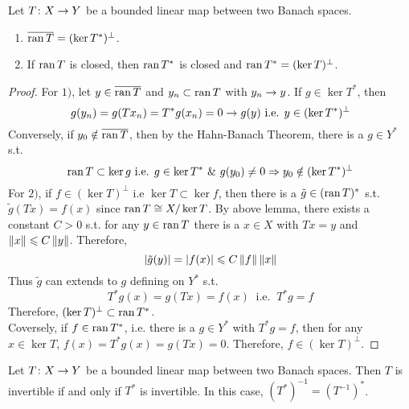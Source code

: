 \documentclass[a4paper,11pt]{report}
\begin{document}
\begin{thm}
	Let $T \colon X \rightarrow Y$ be a bounded linear map between two Banach spaces.
	\begin{enumerate}[label=\arabic*)]
		\item $\overline{\operatorname{ran}{T}} = (\ker{T^{*}})^{\bot}$.
		\item If $\operatorname{ran}{T}$ is closed, then $\operatorname{ran}{T^{*}}$ is closed and $\operatorname{ran}{T^{*}} = (\ker{T})^{\bot}$.
	\end{enumerate}
\end{thm}
\begin{proof}
	For $1)$, let $y \in \overline{\operatorname{ran}{T}}$ and ${y_n} \subset \operatorname{ran}{T}$ with $y_n \rightarrow y$. If $g \in \ker{T^{*}}$, then 
	\begin{equation*}
		g(y_n) = g(Tx_n) = T^{*}g(x_n) = 0 \rightarrow g(y) \text{ i.e. } y \in (\ker{T^{*}})^{\bot}
	\end{equation*}
	Conversely, if $y_0 \notin \overline{\operatorname{ran}{T}}$, then by the Hahn-Banach Theorem, there is a $g \in Y^{*}$ s.t. 
	\begin{equation*}
		\operatorname{ran}{T} \subset \ker{g} \text{ i.e. } g \in \ker{T^{*}} ~\&~ g(y_0) \neq 0 \Rightarrow y_0 \notin (\ker{T^{*}})^{\bot}
	\end{equation*}
	For $2)$, if $f \in (\ker{T})^{\bot}$ i.e $\ker{T} \subset \ker{f}$, then there is a $\tilde{g} \in (\operatorname{ran}{T})^{*}$ s.t. $\tilde{g}(Tx) = f(x)$ since $\operatorname{ran}{T} \cong X/\ker{T}$. By above lemma, there exists a constant $C>0$ s.t. for any $y \in \operatorname{ran}{T}$ there is a $x \in X$ with $Tx=y$ and $\left\lVert x\right\lVert \leqslant C\left\lVert y\right\lVert$. Therefore,
	\begin{equation*}
		\left\lvert\tilde{g}(y)\right\lvert = \left\lvert f(x)\right\lvert \leqslant C\left\lVert f\right\lVert\left\lVert x\right\lVert
	\end{equation*}
	Thus $\tilde{g}$ can extends to $g$ defining on $Y^{*}$ s.t.
	\begin{equation*}
		T^{*}g(x) = g(Tx) = f(x) ~\text{ i.e. }~ T^{*}g = f
	\end{equation*}
	Therefore, $(\ker{T})^{\bot} \subset \operatorname{ran}{T^{*}}$. \\
	Coversely, if $f \in \operatorname{ran}{T^{*}}$, i.e. there is a $g \in Y^{*}$ with $T^{*}g =f$, then for any $x \in \ker{T}$, $f(x) = T^{*}g(x) = g(Tx) = 0$. Therefore, $f \in (\ker{T})^{\bot}$.
\end{proof}
\begin{cor}
	Let $T \colon X \rightarrow Y$ be a bounded linear map between two Banach spaces. Then $T$ is invertible if and only if $T^{*}$ is invertible. In this case, $(T^{*})^{-1} = (T^{-1})^{*}$.
\end{cor}
\end{document}
